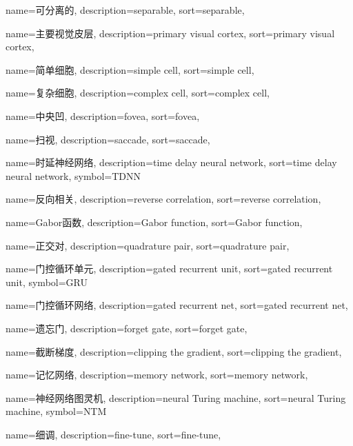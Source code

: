 {
  name=可分离的,
  description={separable},
  sort={separable},
}

{
  name=主要视觉皮层,
  description={primary visual cortex},
  sort={primary visual cortex},
}

{
  name=简单细胞,
  description={simple cell},
  sort={simple cell},
}

{
  name=复杂细胞,
  description={complex cell},
  sort={complex cell},
}

{
  name=中央凹,
  description={fovea},
  sort={fovea},
}

{
  name=扫视,
  description={saccade},
  sort={saccade},
}

{
  name=时延神经网络,
  description={time delay neural network},
  sort={time delay neural network},
  symbol={TDNN}
}

{
  name=反向相关,
  description={reverse correlation},
  sort={reverse correlation},
}

{
  name=Gabor函数,
  description={Gabor function},
  sort={Gabor function},
}

{
  name=正交对,
  description={quadrature pair},
  sort={quadrature pair},
}

{
  name=门控循环单元,
  description={gated recurrent unit},
  sort={gated recurrent unit},
  symbol={GRU}
}

{
  name=门控循环网络,
  description={gated recurrent net},
  sort={gated recurrent net}, 
}

{
  name=遗忘门,
  description={forget gate},
  sort={forget gate},
}

{
  name=截断梯度,
  description={clipping the gradient},
  sort={clipping the gradient},
}

{
  name=记忆网络,
  description={memory network},
  sort={memory network},
}

{
  name=神经网络图灵机,
  description={neural Turing machine},
  sort={neural Turing machine},
  symbol={NTM}
}

{
  name=细调,
  description={fine-tune},
  sort={fine-tune},
}


